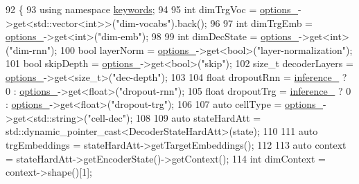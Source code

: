 \begin{DoxyCode}
92                                                           \{
93     \textcolor{keyword}{using namespace }\hyperlink{namespacekeywords}{keywords};
94 
95     \textcolor{keywordtype}{int} dimTrgVoc = \hyperlink{classmarian_1_1DecoderBase_a75375e7661a014fd15bbee3b0a047b91}{options\_}->get<std::vector<int>>(\textcolor{stringliteral}{"dim-vocabs"}).back();
96 
97     \textcolor{keywordtype}{int} dimTrgEmb = \hyperlink{classmarian_1_1DecoderBase_a75375e7661a014fd15bbee3b0a047b91}{options\_}->get<\textcolor{keywordtype}{int}>(\textcolor{stringliteral}{"dim-emb"});
98 
99     \textcolor{keywordtype}{int} dimDecState = \hyperlink{classmarian_1_1DecoderBase_a75375e7661a014fd15bbee3b0a047b91}{options\_}->get<\textcolor{keywordtype}{int}>(\textcolor{stringliteral}{"dim-rnn"});
100     \textcolor{keywordtype}{bool} layerNorm = \hyperlink{classmarian_1_1DecoderBase_a75375e7661a014fd15bbee3b0a047b91}{options\_}->get<\textcolor{keywordtype}{bool}>(\textcolor{stringliteral}{"layer-normalization"});
101     \textcolor{keywordtype}{bool} skipDepth = \hyperlink{classmarian_1_1DecoderBase_a75375e7661a014fd15bbee3b0a047b91}{options\_}->get<\textcolor{keywordtype}{bool}>(\textcolor{stringliteral}{"skip"});
102     \textcolor{keywordtype}{size\_t} decoderLayers = \hyperlink{classmarian_1_1DecoderBase_a75375e7661a014fd15bbee3b0a047b91}{options\_}->get<\textcolor{keywordtype}{size\_t}>(\textcolor{stringliteral}{"dec-depth"});
103 
104     \textcolor{keywordtype}{float} dropoutRnn = \hyperlink{classmarian_1_1DecoderBase_a808975d515f60a53096f6794c3dc61d4}{inference\_} ? 0 : \hyperlink{classmarian_1_1DecoderBase_a75375e7661a014fd15bbee3b0a047b91}{options\_}->get<\textcolor{keywordtype}{float}>(\textcolor{stringliteral}{"dropout-rnn"});
105     \textcolor{keywordtype}{float} dropoutTrg = \hyperlink{classmarian_1_1DecoderBase_a808975d515f60a53096f6794c3dc61d4}{inference\_} ? 0 : \hyperlink{classmarian_1_1DecoderBase_a75375e7661a014fd15bbee3b0a047b91}{options\_}->get<\textcolor{keywordtype}{float}>(\textcolor{stringliteral}{"dropout-trg"});
106 
107     \textcolor{keyword}{auto} cellType = \hyperlink{classmarian_1_1DecoderBase_a75375e7661a014fd15bbee3b0a047b91}{options\_}->get<std::string>(\textcolor{stringliteral}{"cell-dec"});
108 
109     \textcolor{keyword}{auto} stateHardAtt = std::dynamic\_pointer\_cast<DecoderStateHardAtt>(state);
110 
111     \textcolor{keyword}{auto} trgEmbeddings = stateHardAtt->getTargetEmbeddings();
112 
113     \textcolor{keyword}{auto} context = stateHardAtt->getEncoderState()->getContext();
114     \textcolor{keywordtype}{int} dimContext = context->shape()[1];

\end{DoxyCode}
